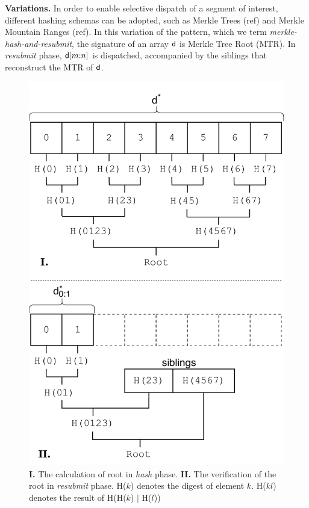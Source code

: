 \noindent \textbf{Variations.}
In order to enable selective dispatch of a segment of interest, different
hashing schemas can be adopted, such as Merkle Trees (ref) and Merkle Mountain
Ranges (ref). In this variation of the pattern, which we term
\emph{merkle-hash-and-resubmit}, the signature of an array $\mathsf{d}$ is
Merkle Tree Root (MTR). In \emph{resubmit} phase, $\mathsf{d}[m{:}n]$ is
dispatched, accompanied by the siblings that reconstruct the MTR of
$\mathsf{d}$.

\begin{figure}[h]
    \begin{center}
        \includegraphics[width=0.8\linewidth]{figures/merkle-har.pdf}
    \end{center}
    \caption{\textbf{I.} The calculation of root in \emph{hash} phase.
    \textbf{II.} The verification of the root in \emph{resubmit} phase.
    \textsf{H}($k$) denotes the digest of element $k$. \textsf{H}($kl$) denotes the
    result of \textsf{H}(\textsf{H}($k$) $|$ \textsf{H}($l$))}
    \label{fig:merkle-har}
\end{figure}


